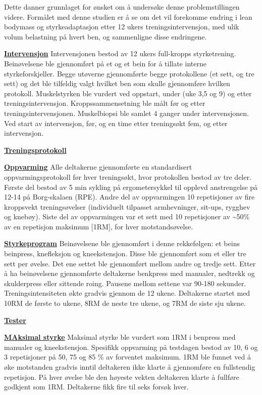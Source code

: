 \documentclass[
]{book}
\begin{document}
Dette danner grunnlaget for ønsket om å undersøke denne problemstillingen videre. Formålet med denne studien er å se om det vil forekomme endring i lean bodymass og styrkeadaptasjon etter 12 ukers treningsintervensjon, med ulik volum belastning på hvert ben, og sammenligne disse endringene.

\underline{\textbf{Intervensjon}}
Intervensjonen bestod av 12 ukers full-kropps styrketrening. Beinøvelsene ble gjennomført på et og et bein for å tillate interne styrkeforskjeller. Begge utøverne gjennomførte begge protokollene (et sett, og tre sett) og det ble tilfeldig valgt hvilket ben som skulle gjennomføre hvilken protokoll. Muskelstyrken ble vurdert ved oppstart, under (uke 3,5 og 9) og etter treningsintervensjon. Kroppssammensetning ble målt før og etter treningsintervensjonen. Muskelbiopsi ble samlet 4 ganger under intervensjonen. Ved start av intervensjon, før, og en time etter treningsøkt fem, og etter intervensjon.

\underline{\textbf{Treningsprotokoll}}

\underline{\textbf{Oppvarming}}
Alle deltakerne gjennomførte en standardisert oppvarmingsprotokoll før hver treningsøkt, hvor protokollen bestod av tre deler. Første del bestod av 5 min sykling på ergometersykkel til opplevd anstrengelse på 12-14 på Borg-skalaen (RPE). Andre del av oppvarmingen 10 repetisjoner av fire kroppsvekt treningsøvelser (individuelt tilpasset armhevninger, sit-ups, rygghev og knebøy). Siste del av oppvarmingen var et sett med 10 repetisjoner av \textasciitilde50\% av en repetisjon maksimum {[}1RM{]}, for hver motstandsøvelse.

\underline{\textbf{Styrkeprogram}}
Beinøvelsene ble gjennomført i denne rekkefølgen: et beins beinpress, knefleksjon og kneekstensjon. Disse ble gjennomført som et eller tre sett per øvelse. Det ene settet ble gjennomført mellom andre og tredje sett. Etter å ha beinøvelsene gjennomførte deltakerne benkpress med manualer, nedtrekk og skulderpress eller sittende roing. Pausene mellom settene var 90-180 sekunder. Treningsintensiteten økte gradvis gjennom de 12 ukene. Deltakerne startet med 10RM de første to ukene, 8RM de neste tre ukene, og 7RM de siste sju ukene.

\underline{\textbf{Tester}}

\underline{\textbf{MAksimal styrke}}
Maksimal styrke ble vurdert som 1RM i benpress med manualer og kneekstensjon. Spesifikk oppvarming på testdagen bestod av 10, 6 og 3 repetisjoner på 50, 75 og 85 \% av forventet maksimum. 1RM ble funnet ved å øke motstanden gradvis inntil deltakeren ikke klarte å gjennomføre en fullstendig repetisjon. På hver øvelse ble den høyeste vekten deltakeren klarte å fullføre godkjent som 1RM. Deltakerne fikk fire til seks forsøk hver.
\end{document}
